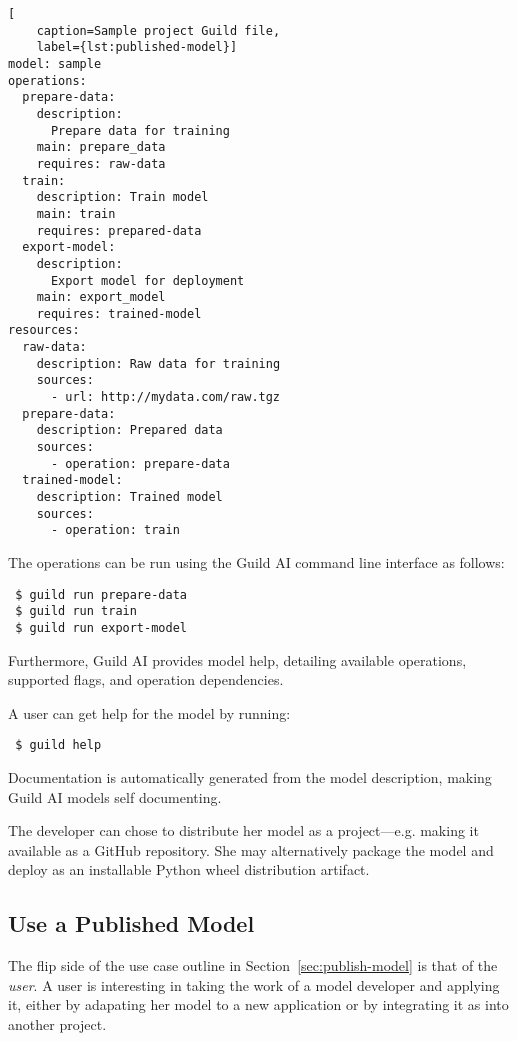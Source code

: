 \documentclass{article}
\begin{document}
\begin{lstlisting}[
    caption=Sample project Guild file,
    label={lst:published-model}]
model: sample
operations:
  prepare-data:
    description:
      Prepare data for training
    main: prepare_data
    requires: raw-data
  train:
    description: Train model
    main: train
    requires: prepared-data
  export-model:
    description:
      Export model for deployment
    main: export_model
    requires: trained-model
resources:
  raw-data:
    description: Raw data for training
    sources:
      - url: http://mydata.com/raw.tgz
  prepare-data:
    description: Prepared data
    sources:
      - operation: prepare-data
  trained-model:
    description: Trained model
    sources:
      - operation: train
\end{lstlisting}

The operations can be run using the Guild AI command line interface as
follows:

{\footnotesize
\begin{verbatim}
 $ guild run prepare-data
 $ guild run train
 $ guild run export-model
\end{verbatim}}

Furthermore, Guild AI provides model help, detailing available
operations, supported flags, and operation dependencies.

A user can get help for the model by running:

{\footnotesize
\begin{verbatim}
 $ guild help
\end{verbatim}}

Documentation is automatically generated from the model description,
making Guild AI models self documenting.

The developer can chose to distribute her model as a
project---e.g. making it available as a GitHub repository. She may
alternatively package the model and deploy as an installable Python
wheel distribution artifact.

\subsection{Use a Published Model}
\label{sec:use-model}

The flip side of the use case outline in
Section~\ref{sec:publish-model} is that of the \emph{user}. A user is
interesting in taking the work of a model developer and applying it,
either by adapating her model to a new application or by integrating
it as into another project.
\end{document}
